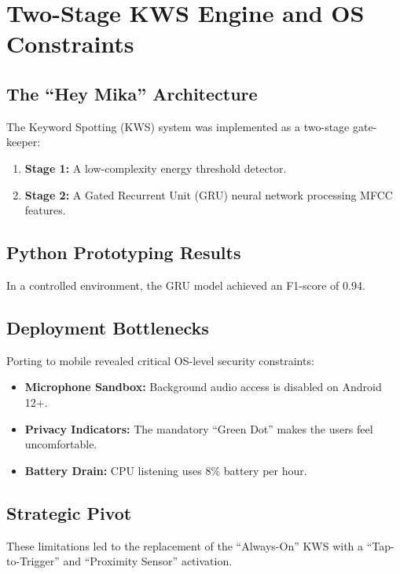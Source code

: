 \documentclass[12pt,a4paper]{report}
\begin{document}
\chapter{Two-Stage KWS Engine and OS Constraints}
\label{appendix:kws}
\thispagestyle{logoheader}

\section{The ``Hey Mika'' Architecture}
The Keyword Spotting (KWS) system was implemented as a two-stage gate-keeper:
\begin{enumerate}
    \item \textbf{Stage 1:} A low-complexity energy threshold detector.
    \item \textbf{Stage 2:} A Gated Recurrent Unit (GRU) neural network processing MFCC features.
\end{enumerate}

\section{Python Prototyping Results}
In a controlled environment, the GRU model achieved an F1-score of 0.94.

\section{Deployment Bottlenecks}
Porting to mobile revealed critical OS-level security constraints:
\begin{itemize}
    \item \textbf{Microphone Sandbox:}  Background audio access is disabled on Android 12+.
    \item \textbf{Privacy Indicators:} The mandatory “Green Dot” makes the users feel uncomfortable.
    \item \textbf{Battery Drain:} CPU listening uses 8\% battery per hour.

\end{itemize}

\section{Strategic Pivot}
These limitations led to the replacement of the ``Always-On'' KWS with a ``Tap-to-Trigger'' and ``Proximity Sensor'' activation.
\end{document}
